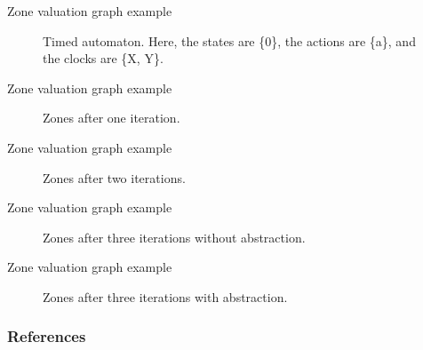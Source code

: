 \documentclass{beamer}
\begin{document}
\begin{frame}{Zone valuation graph example}
  \begin{figure}
    \centering
    \def\svgwidth{0.6\columnwidth}
    
    \caption{Timed automaton. Here, the states are \{0\}, the actions
      are \{a\}, and the clocks are \{X, Y\}.}
  \end{figure}
\end{frame}

\begin{frame}{Zone valuation graph example}
  \begin{figure}
    \centering
    \def\svgwidth{0.4\columnwidth}
    
    \caption{Zones after one iteration.}
  \end{figure}
\end{frame}

\begin{frame}[shrink=20]{Zone valuation graph example}
  \begin{figure}
    \centering
    \def\svgwidth{0.7\columnwidth}
    
    \caption{Zones after two iterations.}
  \end{figure}
\end{frame}

\begin{frame}[shrink=20]{Zone valuation graph example}
  \begin{figure}
    \centering
    \def\svgwidth{0.9\columnwidth}
    
    \caption{Zones after three iterations without abstraction.}
  \end{figure}
\end{frame}

\begin{frame}[shrink=20]{Zone valuation graph example}
  \begin{figure}
    \centering
    \def\svgwidth{1.2\columnwidth}
    
    \caption{Zones after three iterations with abstraction.}
  \end{figure}
\end{frame}

\begin{frame}[allowframebreaks,shrink=20]
  \frametitle{References}
  
  
\end{frame}
\end{document}
